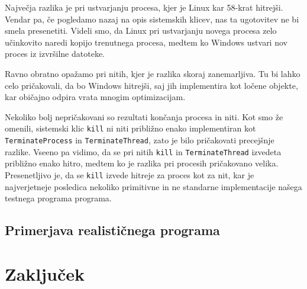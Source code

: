 \documentclass[a4paper,12pt,openright]{book}
\begin{document}
Največja razlika je pri ustvarjanju procesa, kjer je Linux kar 58-krat hitrejši.
Vendar pa, če pogledamo nazaj na opis sistemskih klicev, nas ta ugotovitev ne bi smela presenetiti.
Videli smo, da Linux pri ustvarjanju novega procesa zelo učinkovito naredi kopijo trenutnega procesa, medtem ko Windows ustvari nov proces iz izvršilne datoteke.

Ravno obratno opažamo pri nitih, kjer je razlika skoraj zanemarljiva.
Tu bi lahko celo pričakovali, da bo Windows hitrejši, saj jih implementira kot ločene objekte, kar običajno odpira vrata mnogim optimizacijam.

Nekoliko bolj nepričakovani so rezultati končanja procesa in niti.
Kot smo že omenili, sistemski klic \texttt{kill} ni niti približno enako implementiran kot \texttt{TerminateProcess} in \texttt{TerminateThread}, zato je bilo pričakovati precejšnje razlike.
Vseeno pa vidimo, da se pri nitih \texttt{kill} in \texttt{TerminateThread} izvedeta približno enako hitro, medtem ko je razlika pri procesih pričakovano velika.
Presenetljivo je, da se \texttt{kill} izvede hitreje za proces kot za nit, kar je najverjetneje posledica nekoliko primitivne in ne standarne implementacije našega testnega programa programa.

\section{Primerjava realističnega programa}

\chapter{Zaključek}


\printbibliography[heading=bibintoc,title={Literatura}]
\end{document}
